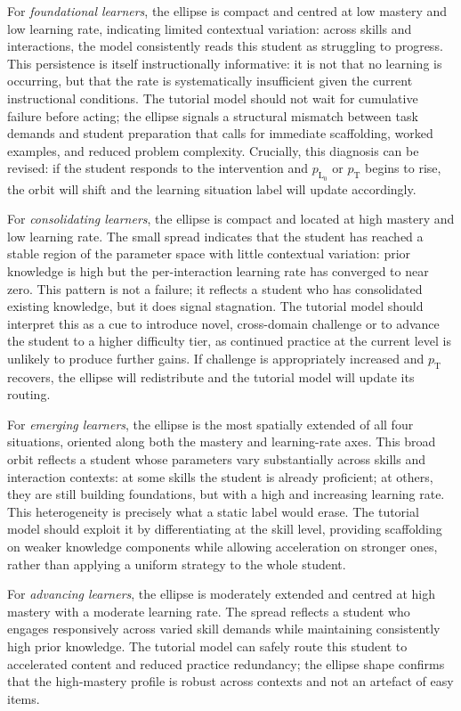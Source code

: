 \documentclass[runningheads]{llncs}
\begin{document}
For \textit{foundational learners}, the ellipse is compact and centred at low mastery and low learning rate, indicating limited contextual variation: across skills and interactions, the model consistently reads this student as struggling to progress. This persistence is itself instructionally informative: it is not that no learning is occurring, but that the rate is systematically insufficient given the current instructional conditions. The tutorial model should not wait for cumulative failure before acting; the ellipse signals a structural mismatch between task demands and student preparation that calls for immediate scaffolding, worked examples, and reduced problem complexity. Crucially, this diagnosis can be revised: if the student responds to the intervention and $p_{\text{L}_0}$ or $p_{\text{T}}$ begins to rise, the orbit will shift and the learning situation label will update accordingly.

For \textit{consolidating learners}, the ellipse is compact and located at high mastery and low learning rate. The small spread indicates that the student has reached a stable region of the parameter space with little contextual variation: prior knowledge is high but the per-interaction learning rate has converged to near zero. This pattern is not a failure; it reflects a student who has consolidated existing knowledge, but it does signal stagnation. The tutorial model should interpret this as a cue to introduce novel, cross-domain challenge or to advance the student to a higher difficulty tier, as continued practice at the current level is unlikely to produce further gains. If challenge is appropriately increased and $p_{\text{T}}$ recovers, the ellipse will redistribute and the tutorial model will update its routing.

For \textit{emerging learners}, the ellipse is the most spatially extended of all four situations, oriented along both the mastery and learning-rate axes. This broad orbit reflects a student whose parameters vary substantially across skills and interaction contexts: at some skills the student is already proficient; at others, they are still building foundations, but with a high and increasing learning rate. This heterogeneity is precisely what a static label would erase. The tutorial model should exploit it by differentiating at the skill level, providing scaffolding on weaker knowledge components while allowing acceleration on stronger ones, rather than applying a uniform strategy to the whole student.

For \textit{advancing learners}, the ellipse is moderately extended and centred at high mastery with a moderate learning rate. The spread reflects a student who engages responsively across varied skill demands while maintaining consistently high prior knowledge. The tutorial model can safely route this student to accelerated content and reduced practice redundancy; the ellipse shape confirms that the high-mastery profile is robust across contexts and not an artefact of easy items.
\end{document}
